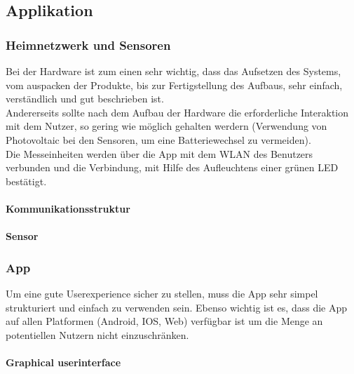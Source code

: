 \documentclass[12pt]{article}
\theoremstyle{definition}
\begin{document}
\subsection{Applikation}

\subsubsection{Heimnetzwerk und Sensoren}
Bei der Hardware ist zum einen sehr wichtig, dass das Aufsetzen des Systems, vom auspacken der Produkte, bis zur Fertigstellung des Aufbaus, sehr einfach, verständlich und gut beschrieben ist.
\\
Andererseits sollte nach dem Aufbau der Hardware die erforderliche Interaktion mit dem Nutzer, so gering wie möglich gehalten werdern (Verwendung von Photovoltaic bei den Sensoren, um eine Batteriewechsel zu vermeiden).
\\
Die Messeinheiten werden über die App mit dem WLAN des Benutzers verbunden und die Verbindung, mit Hilfe des Aufleuchtens einer grünen LED bestätigt.

\paragraph{Kommunikationsstruktur}
\begin{center}

\end{center}
\pagebreak
\paragraph{Sensor}
\begin{center}

\end{center}

\subsubsection{App}
Um eine gute Userexperience sicher zu stellen, muss die App sehr simpel strukturiert und einfach zu verwenden sein. Ebenso wichtig ist es, dass die App auf allen Platformen (Android, IOS, Web) verfügbar ist um die Menge an potentiellen Nutzern nicht einzuschränken.
\paragraph{Graphical userinterface}
\begin{flushleft}

\end{flushleft}
\end{document}
